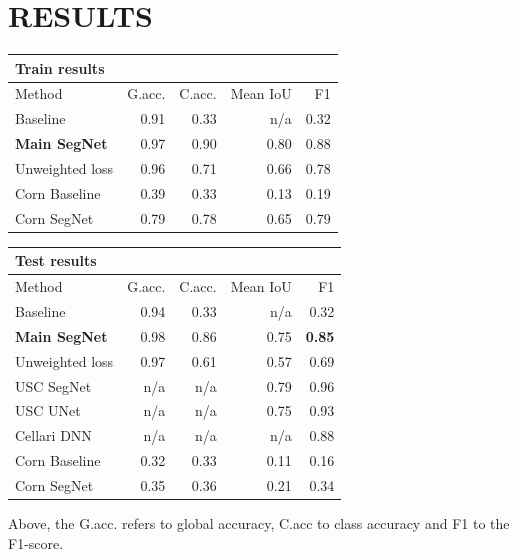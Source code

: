 \documentclass{article}
\begin{document}
\vspace*{-.75cm}
\section{RESULTS}
\label{sec:illust}

\begin{table}[!htb]
	\centering
	\begin{tabular}{l r r r r}
		\textbf{Train results} & & & & \\
		\toprule
		Method  &  G.acc.  &  C.acc.  &  Mean IoU  &  F1 \\ \midrule
		Baseline  &  0.91  &  0.33  &  n/a  &  0.32 \\
		\textbf{Main SegNet}  &  0.97  &  0.90  &  0.80  &  0.88 \\
		Unweighted loss   &  0.96  &  0.71  &  0.66  &  0.78 \\
		\midrule 
		Corn Baseline  &  0.39  &  0.33  &  0.13  &  0.19 \\
		Corn SegNet  &  0.79  &  0.78  &  0.65  &  0.79 \\
		\bottomrule
	\end{tabular}
\end{table}

\begin{table}[!htb]
	\centering
	\begin{tabular}{l r r r r}
		\textbf{Test results} & & & & \\
		\toprule
		Method  &  G.acc.  &  C.acc.  &  Mean IoU  &  F1 \\ \midrule
		Baseline  &  0.94  &  0.33  &  n/a  &  0.32 \\
		\textbf{Main SegNet}  &  0.98  &  0.86  &  0.75  & \textbf{ 0.85} \\
		Unweighted loss  &  0.97  &  0.61  &  0.57  &  0.69 \\
		\midrule
		USC SegNet  &  n/a  &  n/a  &  0.79  &  0.96 \\
		USC UNet  &  n/a  &  n/a  &  0.75  &  0.93 \\
		Cellari DNN  &  n/a  &  n/a  &  n/a  &  0.88 \\
		\midrule 
		Corn Baseline  &  0.32  &  0.33  &  0.11  &  0.16 \\
		Corn SegNet   &  0.35  &  0.36  &  0.21  &  0.34 \\
		\bottomrule
	\end{tabular}
\end{table}
\noindent Above, the G.acc. refers to global accuracy, C.acc to class accuracy and F1 to the F1-score.
\end{document}
